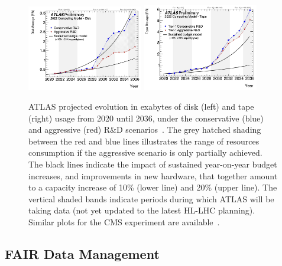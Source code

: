 \begin{figure}[htbp]
\begin{center}
\includegraphics[width=0.45\textwidth]{figures/Figure3a} 
\includegraphics[width=0.45\textwidth]{figures/Figure3b} \\ 
\caption{ATLAS projected evolution in exabytes of disk (left) and tape (right) usage from 2020 until 2036, under the conservative (blue) and aggressive (red) R\&D scenarios~\cite{CERN-LHCC-2022-005}. The grey hatched shading between the red and blue lines illustrates the range of resources consumption if the aggressive scenario is only partially achieved. The black lines indicate the impact of sustained year-on-year budget increases, and improvements in new hardware, that together amount to a capacity increase of 10\% (lower line) and 20\% (upper line). The vertical shaded bands indicate periods during which ATLAS will be taking data (not yet updated to the latest HL-LHC planning). Similar plots for the CMS experiment are available~\cite{Software:2815292}.}
\label{figures:Fig3}
\end{center}
\end{figure}


\subsection{FAIR Data Management}

